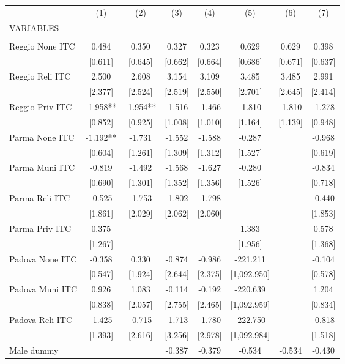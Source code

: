 \begin{tabular}{lccccccc} \hline
 & (1) & (2) & (3) & (4) & (5) & (6) & (7) \\
VARIABLES &  &  &  &  &  &  &  \\ \hline
 &  &  &  &  &  &  &  \\
Reggio None ITC & 0.484 & 0.350 & 0.327 & 0.323 & 0.629 & 0.629 & 0.398 \\
 & [0.611] & [0.645] & [0.662] & [0.664] & [0.686] & [0.671] & [0.637] \\
Reggio Reli ITC & 2.500 & 2.608 & 3.154 & 3.109 & 3.485 & 3.485 & 2.991 \\
 & [2.377] & [2.524] & [2.519] & [2.550] & [2.701] & [2.645] & [2.414] \\
Reggio Priv ITC & -1.958** & -1.954** & -1.516 & -1.466 & -1.810 & -1.810 & -1.278 \\
 & [0.852] & [0.925] & [1.008] & [1.010] & [1.164] & [1.139] & [0.948] \\
Parma None ITC & -1.192** & -1.731 & -1.552 & -1.588 & -0.287 &  & -0.968 \\
 & [0.604] & [1.261] & [1.309] & [1.312] & [1.527] &  & [0.619] \\
Parma Muni ITC & -0.819 & -1.492 & -1.568 & -1.627 & -0.280 &  & -0.834 \\
 & [0.690] & [1.301] & [1.352] & [1.356] & [1.526] &  & [0.718] \\
Parma Reli ITC & -0.525 & -1.753 & -1.802 & -1.798 &  &  & -0.440 \\
 & [1.861] & [2.029] & [2.062] & [2.060] &  &  & [1.853] \\
Parma Priv ITC & 0.375 &  &  &  & 1.383 &  & 0.578 \\
 & [1.267] &  &  &  & [1.956] &  & [1.368] \\
Padova None ITC & -0.358 & 0.330 & -0.874 & -0.986 & -221.211 &  & -0.104 \\
 & [0.547] & [1.924] & [2.644] & [2.375] & [1,092.950] &  & [0.578] \\
Padova Muni ITC & 0.926 & 1.083 & -0.114 & -0.192 & -220.639 &  & 1.204 \\
 & [0.838] & [2.057] & [2.755] & [2.465] & [1,092.959] &  & [0.834] \\
Padova Reli ITC & -1.425 & -0.715 & -1.713 & -1.780 & -222.750 &  & -0.818 \\
 & [1.393] & [2.616] & [3.256] & [2.978] & [1,092.984] &  & [1.518] \\
Male dummy &  &  & -0.387 & -0.379 & -0.534 & -0.534 & -0.430 \\

\end{tabular}
